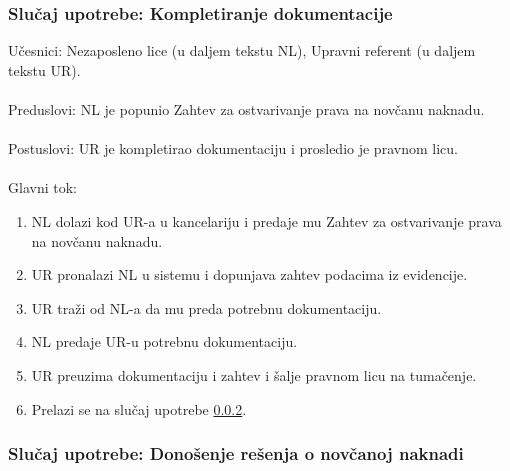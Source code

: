 \subsubsection{Slu\v caj upotrebe: Kompletiranje dokumentacije}
\label{su: kompletiranje dokumentacije}

\noindent U\v cesnici: Nezaposleno lice (u daljem tekstu NL), Upravni referent (u daljem tekstu UR).
\\
\\ Preduslovi: NL je popunio Zahtev za ostvarivanje prava na nov\v canu naknadu.
\\
\\ Postuslovi: UR je kompletirao dokumentaciju i prosledio je pravnom licu.
\\
\\ Glavni tok:
\begin{enumerate}
\item NL dolazi kod UR-a u kancelariju i predaje mu Zahtev za ostvarivanje prava na nov\v canu naknadu.
\item UR pronalazi NL u sistemu i dopunjava zahtev podacima iz evidencije.
\item UR tra\v zi od NL-a da mu preda potrebnu dokumentaciju.
\item NL predaje UR-u potrebnu dokumentaciju.
\item UR preuzima dokumentaciju i zahtev i \v salje pravnom licu na tuma\v cenje.
\item Prelazi se na slu\v caj upotrebe \ref{su: resenje}.
\end{enumerate}

\subsubsection{Slu\v caj upotrebe: Dono\v senje re\v senja o nov\v canoj naknadi}
\label{su: resenje}

